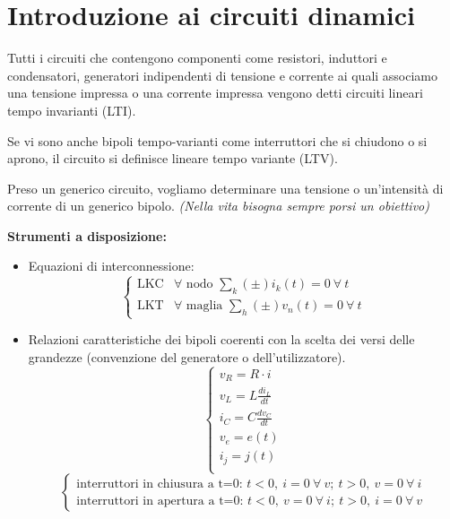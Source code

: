 \section{Introduzione ai circuiti dinamici}
Tutti i circuiti che contengono componenti come
resistori, induttori e condensatori, generatori indipendenti di tensione e corrente ai quali associamo 
una tensione impressa o una corrente impressa vengono detti circuiti lineari tempo invarianti (LTI).

Se vi sono anche bipoli tempo-varianti come interruttori che si chiudono o si aprono, il circuito
si definisce lineare tempo variante (LTV).

Preso un generico circuito, vogliamo determinare una tensione o un'intensità di corrente di un generico
bipolo.
\textit{(Nella vita bisogna sempre porsi un obiettivo)}

\textbf{Strumenti a disposizione:}

\begin{itemize}
\item Equazioni di interconnessione:
\begin{equation} \label{eq:leggi_kirchooff}
\begin{cases}
        \text{LKC} & \forall \text{ nodo } \sum_{k} (\pm) i_k(t) = 0\ \forall\ t \\
        \text{LKT} & \forall \text{ maglia } \sum_{h} (\pm) v_n(t) = 0\ \forall\ t
\end{cases}
\end{equation}

\item Relazioni caratteristiche dei bipoli coerenti con la scelta dei versi delle grandezze (convenzione del generatore o dell'utilizzatore).
\begin{equation}
\begin{cases}
v_R  = R\cdot i \\
v_L  = L\frac{di_L}{dt} \\
i_C  = C\frac{dv_C}{dt} \\
v_e  = e(t)\\
i_j  = j(t) \\
\end{cases}
\end{equation}
\begin{equation*}
\begin{cases}
\text{interruttori in chiusura a t=0: }  {t<0,\ i = 0\ \forall\ v;\ t > 0,\ v = 0\ \forall\ i} \\
\text{interruttori in apertura a t=0: }  {t<0,\ v = 0\ \forall\ i;\ t > 0,\ i = 0\ \forall\ v} 
\end{cases}
\end{equation*}
\end{itemize}

